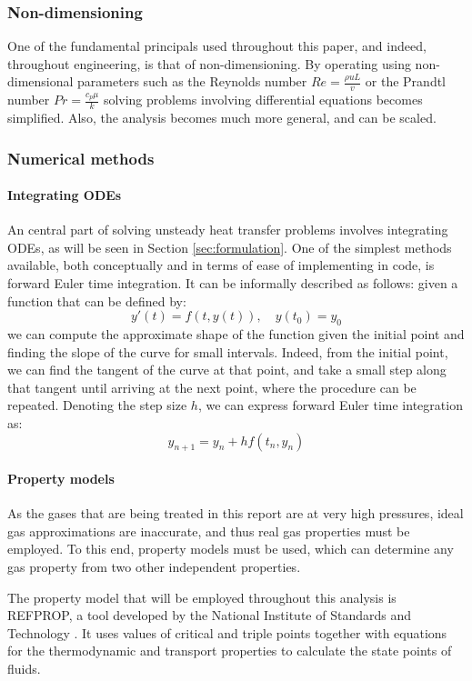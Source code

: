 \subsubsection{Non-dimensioning}

One of the fundamental principals used throughout this paper, and indeed, throughout engineering, is that of non-dimensioning. By operating using non-dimensional parameters such as the Reynolds number $Re = \frac{\rho u L}{v}$ or the Prandtl number $Pr = \frac{c_p \mu}{k}$ solving problems involving differential equations becomes simplified. Also, the analysis becomes much more general, and can be scaled.

\subsubsection{Numerical methods}
\label{sec:numerical_methods}
\paragraph{Integrating ODEs}

An central part of solving unsteady heat transfer problems involves integrating ODEs, as will be seen in Section \ref{sec:formulation}. One of the simplest methods available, both conceptually and in terms of ease of implementing in code, is forward Euler time integration. It can be informally described as follows: given a function that can be defined by: 
\begin{equation}
y'(t) = f(t,y(t)), \quad y(t_0) = y_0
\end{equation}
we can compute the approximate shape of the function given the initial point and finding the slope of the curve for small intervals. Indeed, from the initial point, we can find the tangent of the curve at that point, and take a small step along that tangent until arriving at the next point, where the procedure can be repeated. Denoting the step size $h$, we can express forward Euler time integration as:
\begin{equation}
y_{n+1} =  y_n + hf(t_n,y_n)
\end{equation}

\paragraph{Property models}
\label{sec:property_models}
As the gases that are being treated in this report are at very high pressures, ideal gas approximations are inaccurate, and thus real gas properties must be employed. To this end, property models must be used, which can determine any gas property from two other independent properties.

The property model that will be employed throughout this analysis is REFPROP, a tool developed by the National Institute of Standards and Technology \cite{refprop}. It uses values of critical and triple points together with equations for the thermodynamic and transport properties to calculate the state points of fluids.



